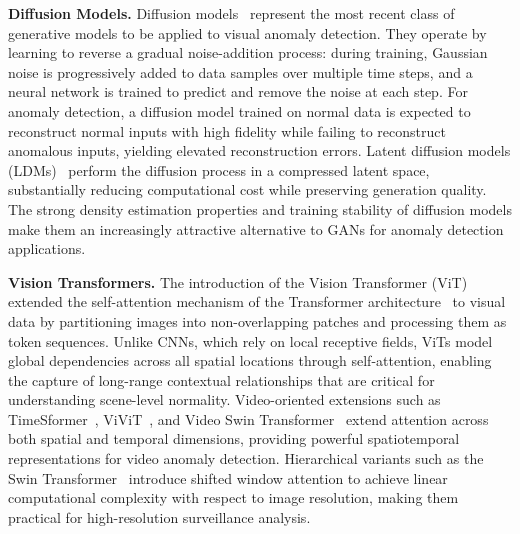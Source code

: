 \documentclass[10pt,a4paper]{article}
\begin{document}
\textbf{Diffusion Models.} Diffusion models~\citep{ho2020denoising, song2020score} represent the most recent class of generative models to be applied to visual anomaly detection. They operate by learning to reverse a gradual noise-addition process: during training, Gaussian noise is progressively added to data samples over multiple time steps, and a neural network is trained to predict and remove the noise at each step. For anomaly detection, a diffusion model trained on normal data is expected to reconstruct normal inputs with high fidelity while failing to reconstruct anomalous inputs, yielding elevated reconstruction errors. Latent diffusion models (LDMs)~\citep{rombach2022high} perform the diffusion process in a compressed latent space, substantially reducing computational cost while preserving generation quality. The strong density estimation properties and training stability of diffusion models make them an increasingly attractive alternative to GANs for anomaly detection applications.

\textbf{Vision Transformers.} The introduction of the Vision Transformer (ViT)~\citep{dosovitskiy2020image} extended the self-attention mechanism of the Transformer architecture~\citep{vaswani2017attention} to visual data by partitioning images into non-overlapping patches and processing them as token sequences. Unlike CNNs, which rely on local receptive fields, ViTs model global dependencies across all spatial locations through self-attention, enabling the capture of long-range contextual relationships that are critical for understanding scene-level normality. Video-oriented extensions such as TimeSformer~\citep{bertasius2021space}, ViViT~\citep{arnab2021vivit}, and Video Swin Transformer~\citep{liu2022video} extend attention across both spatial and temporal dimensions, providing powerful spatiotemporal representations for video anomaly detection. Hierarchical variants such as the Swin Transformer~\citep{liu2021swin} introduce shifted window attention to achieve linear computational complexity with respect to image resolution, making them practical for high-resolution surveillance analysis.
\end{document}
